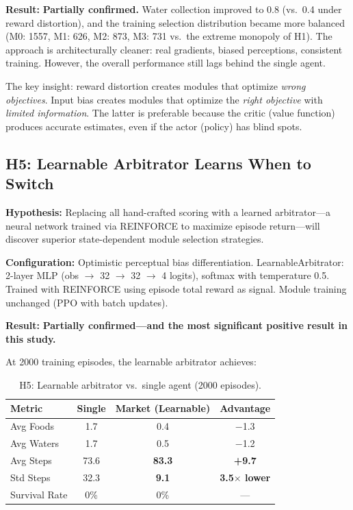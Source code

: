 \documentclass[a4paper,11pt]{article}
\begin{document}
\textbf{Result:} \textbf{Partially confirmed.} Water collection improved to 0.8 (vs.\ 0.4 under reward distortion), and the training selection distribution became more balanced (M0: 1557, M1: 626, M2: 873, M3: 731 vs.\ the extreme monopoly of H1). The approach is architecturally cleaner: real gradients, biased perceptions, consistent training. However, the overall performance still lags behind the single agent.

The key insight: reward distortion creates modules that optimize \textit{wrong objectives}. Input bias creates modules that optimize the \textit{right objective} with \textit{limited information}. The latter is preferable because the critic (value function) produces accurate estimates, even if the actor (policy) has blind spots.

\subsection{H5: Learnable Arbitrator Learns When to Switch}

\textbf{Hypothesis:} Replacing all hand-crafted scoring with a learned arbitrator---a neural network trained via REINFORCE to maximize episode return---will discover superior state-dependent module selection strategies.

\textbf{Configuration:} Optimistic perceptual bias differentiation. LearnableArbitrator: 2-layer MLP (obs $\rightarrow$ 32 $\rightarrow$ 32 $\rightarrow$ 4 logits), softmax with temperature 0.5. Trained with REINFORCE using episode total reward as signal. Module training unchanged (PPO with batch updates).

\textbf{Result:} \textbf{Partially confirmed---and the most significant positive result in this study.}

At 2000 training episodes, the learnable arbitrator achieves:

\begin{table}[H]
\centering
\caption{H5: Learnable arbitrator vs.\ single agent (2000 episodes).}
\label{tab:h5}
\begin{tabular}{lccc}
\toprule
\textbf{Metric} & \textbf{Single} & \textbf{Market (Learnable)} & \textbf{Advantage} \\
\midrule
Avg Foods         & 1.7 & 0.4   & $-$1.3 \\
Avg Waters        & 1.7 & 0.5   & $-$1.2 \\
Avg Steps         & 73.6 & \textbf{83.3} & \textbf{+9.7} \\
Std Steps         & 32.3 & \textbf{9.1}  & \textbf{3.5$\times$ lower} \\
Survival Rate     & 0\%  & 0\%   & --- \\
\bottomrule
\end{tabular}
\end{table}
\end{document}
